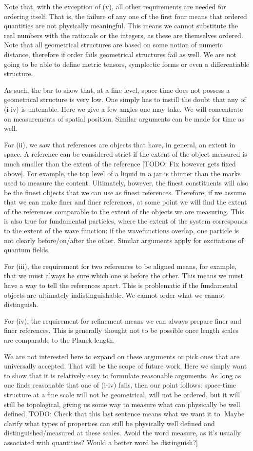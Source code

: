 \documentclass[12pt]{iopart}
\begin{document}
Note that, with the exception of (v), all other requirements are needed for ordering itself. That is, the failure of any one of the first four means that ordered quantities are not physically meaningful. This means we cannot substitute the real numbers with the rationals or the integers, as these are themselves ordered. Note that all geometrical structures are based on some notion of numeric distance, therefore if order fails geometrical structures fail as well. We are not going to be able to define metric tensors, symplectic forms or even a differentiable structure.

As such, the bar to show that, at a fine level, space-time does not possess a geometrical structure is very low. One simply has to instill the doubt that any of (i-iv) is untenable. Here we give a few angles one may take. We will concentrate on measurements of spatial position. Similar arguments can be made for time as well.

For (ii), we saw that references are objects that have, in general, an extent in space. A reference can be considered strict if the extent of the object measured is much smaller than the extent of the reference [TODO: Fix however gets fixed above]. For example, the top level of a liquid in a jar is thinner than the marks used to measure the content. Ultimately, however, the finest constituents will also be the finest objects that we can use as finest references. Therefore, if we assume that we can make finer and finer references, at some point we will find the extent of the references comparable to the extent of the objects we are measuring. This is also true for fundamental particles, where the extent of the system corresponds to the extent of the wave function: if the wavefunctions overlap, one particle is not clearly before/on/after the other. Similar arguments apply for excitations of quantum fields.

For (iii), the requirement for two references to be aligned means, for example, that we must always be sure which one is before the other. This means we must have a way to tell the references apart. This is problematic if the fundamental objects are ultimately indistinguishable. We cannot order what we cannot distinguish.

For (iv), the requirement for refinement means we can always prepare finer and finer references. This is generally thought not to be possible once length scales are comparable to the Planck length.

We are not interested here to expand on these arguments or pick ones that are universally accepted. That will be the scope of future work. Here we simply want to show that it is relatively easy to formulate reasonable arguments. As long as one finds reasonable that one of (i-iv) fails, then our point follows: space-time structure at a fine scale will not be geometrical, will not be ordered, but it will still be topological, giving us some way to measure what can physically be well defined.[TODO: Check that this last sentence means what we want it to.  Maybe clarify what types of properties can still be physically well defined and distinguished/measured at these scales. Avoid the word measure, as it's usually associated with quantities?  Would a better word be distinguish?]
\end{document}
